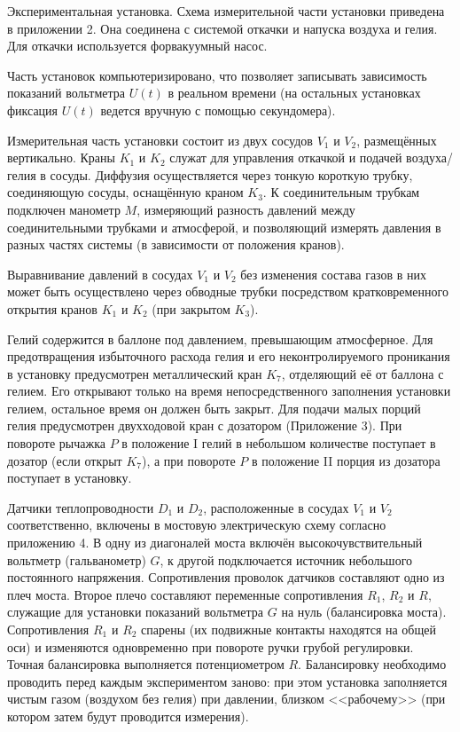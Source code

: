 \documentclass[a4paper]{article}
\begin{document}
	
	Экспериментальная установка. Схема измерительной части установки приведена в приложении 2. Она соединена с системой откачки и напуска воздуха и гелия. Для откачки используется форвакуумный насос.
	
	Часть установок компьютеризировано, что позволяет записывать зависимость показаний вольтметра $U(t)$ в реальном времени (на остальных установках фиксация $U(t)$ ведется вручную с помощью секундомера).
	
	Измерительная часть установки состоит из двух сосудов $V_1$ и $V_2$, размещённых вертикально. Краны $K_1$ и $K_2$ служат для управления откачкой и подачей воздуха/гелия в сосуды. Диффузия осуществляется через тонкую короткую трубку, соединяющую сосуды, оснащённую краном $K_3$. К соединительным трубкам подключен манометр $M$, измеряющий разность давлений между соединительными трубками и атмосферой, и позволяющий измерять давления в разных частях системы (в зависимости от положения кранов).
	
	Выравнивание давлений в сосудах $V_1$ и $V_2$ без изменения состава газов в них может быть осуществлено через обводные трубки посредством кратковременного открытия кранов $K_1$ и $K_2$ (при закрытом $K_3$).
	
	Гелий содержится в баллоне под давлением, превышающим атмосферное. Для предотвращения избыточного расхода гелия и его неконтролируемого проникания в установку предусмотрен металлический кран $K_7$, отделяющий её от баллона с гелием. Его открывают только на время непосредственного заполнения установки гелием, остальное время он должен быть закрыт. Для подачи малых порций гелия предусмотрен двухходовой кран с дозатором (Приложение 3). При повороте рычажка $P$ в положение I гелий в небольшом количестве поступает в дозатор (если открыт $K_7$), а при повороте $P$ в положение II порция из дозатора поступает в установку.
	
	
	Датчики теплопроводности $D_1$ и $D_2$, расположенные в сосудах $V_1$ и $V_2$ соответственно, включены в мостовую электрическую схему согласно приложению 4. В одну из диагоналей моста включён высокочувствительный вольтметр (гальванометр) $G$, к другой подключается источник небольшого постоянного напряжения. Сопротивления проволок датчиков составляют одно из плеч моста. Второе плечо составляют переменные сопротивления $R_1$, $R_2$ и $R$, служащие для установки показаний вольтметра $G$ на нуль (балансировка моста). Сопротивления $R_1$ и $R_2$ спарены (их подвижные контакты находятся на общей оси) и изменяются одновременно при повороте ручки грубой регулировки. Точная балансировка выполняется потенциометром $R$. Балансировку необходимо проводить перед каждым экспериментом заново: при этом установка заполняется чистым газом (воздухом без гелия) при давлении, близком <<рабочему>> (при котором затем будут проводится измерения).
	
\end{document}
